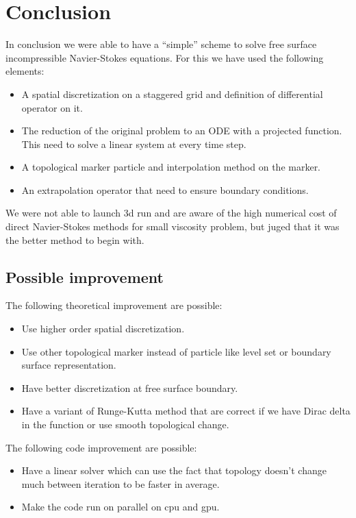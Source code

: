 \chapter{Conclusion}

In conclusion we were able to have a ``simple'' scheme to solve free surface incompressible 
Navier-Stokes equations.
For this we have used the following elements:
\begin{itemize}
 \item A spatial discretization on a staggered grid and definition of differential operator on it.
 \item The reduction of the original problem to an ODE with a projected function.
 This need to solve a linear system at every time step.
 \item A topological marker particle and interpolation method on the marker.
 \item An extrapolation operator that need to ensure boundary conditions.
\end{itemize}

We were not able to launch 3d run and are aware of the high numerical cost of direct Navier-Stokes
methods for small viscosity problem, but juged that it was the better method to begin with.

\section{Possible improvement}

The following theoretical improvement are possible:
\begin{itemize}
 \item Use higher order spatial discretization.
 \item Use other topological marker instead of particle like level set or boundary surface representation.
 \item Have better discretization at free surface boundary.
 \item Have a variant of Runge-Kutta method that are correct if we have Dirac delta in the function 
 or use smooth topological change.
\end{itemize}

The following code improvement are possible:
\begin{itemize}
 \item Have a linear solver which can use the fact that topology doesn't change much between iteration
 to be faster in average.
 \item Make the code run on parallel on cpu and gpu.
\end{itemize}

